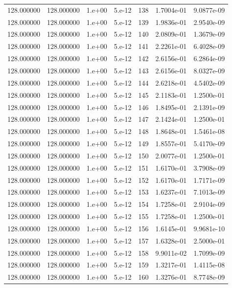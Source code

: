 \begin{table}[htbp]
\begin{tabular}{rrrrrrr}
128.000000 & 128.000000 & 1.e+00 & 5.e-12 & 138 & 1.7004e-01 & 9.0877e-09 \\
128.000000 & 128.000000 & 1.e+00 & 5.e-12 & 139 & 1.9836e-01 & 2.9540e-09 \\
128.000000 & 128.000000 & 1.e+00 & 5.e-12 & 140 & 2.0809e-01 & 1.3679e-09 \\
128.000000 & 128.000000 & 1.e+00 & 5.e-12 & 141 & 2.2261e-01 & 6.4028e-09 \\
128.000000 & 128.000000 & 1.e+00 & 5.e-12 & 142 & 2.6156e-01 & 6.2864e-09 \\
128.000000 & 128.000000 & 1.e+00 & 5.e-12 & 143 & 2.6156e-01 & 8.0327e-09 \\
128.000000 & 128.000000 & 1.e+00 & 5.e-12 & 144 & 2.6218e-01 & 4.5402e-09 \\
128.000000 & 128.000000 & 1.e+00 & 5.e-12 & 145 & 2.1183e-01 & 1.2500e-01 \\
128.000000 & 128.000000 & 1.e+00 & 5.e-12 & 146 & 1.8495e-01 & 2.1391e-09 \\
128.000000 & 128.000000 & 1.e+00 & 5.e-12 & 147 & 2.1424e-01 & 1.2500e-01 \\
128.000000 & 128.000000 & 1.e+00 & 5.e-12 & 148 & 1.8648e-01 & 1.5461e-08 \\
128.000000 & 128.000000 & 1.e+00 & 5.e-12 & 149 & 1.8557e-01 & 5.4170e-09 \\
128.000000 & 128.000000 & 1.e+00 & 5.e-12 & 150 & 2.0077e-01 & 1.2500e-01 \\
128.000000 & 128.000000 & 1.e+00 & 5.e-12 & 151 & 1.6170e-01 & 3.7908e-09 \\
128.000000 & 128.000000 & 1.e+00 & 5.e-12 & 152 & 1.6170e-01 & 1.7171e-09 \\
128.000000 & 128.000000 & 1.e+00 & 5.e-12 & 153 & 1.6237e-01 & 7.1013e-09 \\
128.000000 & 128.000000 & 1.e+00 & 5.e-12 & 154 & 1.7258e-01 & 2.9104e-09 \\
128.000000 & 128.000000 & 1.e+00 & 5.e-12 & 155 & 1.7258e-01 & 1.2500e-01 \\
128.000000 & 128.000000 & 1.e+00 & 5.e-12 & 156 & 1.6145e-01 & 9.9681e-10 \\
128.000000 & 128.000000 & 1.e+00 & 5.e-12 & 157 & 1.6328e-01 & 2.5000e-01 \\
128.000000 & 128.000000 & 1.e+00 & 5.e-12 & 158 & 9.9011e-02 & 1.7099e-09 \\
128.000000 & 128.000000 & 1.e+00 & 5.e-12 & 159 & 1.3217e-01 & 1.4115e-08 \\
128.000000 & 128.000000 & 1.e+00 & 5.e-12 & 160 & 1.3276e-01 & 8.7748e-09 \\

\end{tabular}
\end{table}
